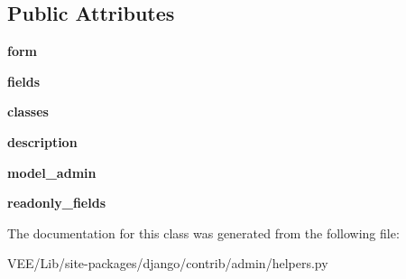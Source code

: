 \subsection*{Public Attributes}
\begin{DoxyCompactItemize}
\item 
\mbox{\label{classdjango_1_1contrib_1_1admin_1_1helpers_1_1_fieldset_ac0128f9a3e752d97808e71530bd617cd}} 
{\bfseries form}
\item 
\mbox{\label{classdjango_1_1contrib_1_1admin_1_1helpers_1_1_fieldset_a2342328705b89b4e9e3c2332cb2e9e07}} 
{\bfseries fields}
\item 
\mbox{\label{classdjango_1_1contrib_1_1admin_1_1helpers_1_1_fieldset_a98afb54ff0c3b946bb3e62e33b5f1aa6}} 
{\bfseries classes}
\item 
\mbox{\label{classdjango_1_1contrib_1_1admin_1_1helpers_1_1_fieldset_a2b7df7155588ee229fb50f92955622c2}} 
{\bfseries description}
\item 
\mbox{\label{classdjango_1_1contrib_1_1admin_1_1helpers_1_1_fieldset_acf9c8e364ccc59c2669fd7735d45b402}} 
{\bfseries model\+\_\+admin}
\item 
\mbox{\label{classdjango_1_1contrib_1_1admin_1_1helpers_1_1_fieldset_a793aa3fdc641664e18eb2e6c63ff9b87}} 
{\bfseries readonly\+\_\+fields}
\end{DoxyCompactItemize}


The documentation for this class was generated from the following file\+:\begin{DoxyCompactItemize}
\item 
V\+E\+E/\+Lib/site-\/packages/django/contrib/admin/helpers.\+py\end{DoxyCompactItemize}
